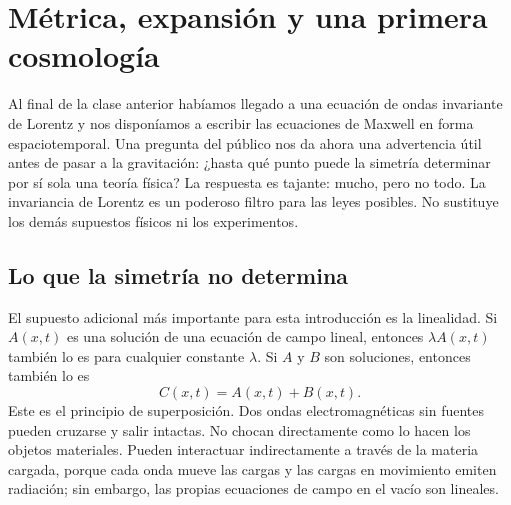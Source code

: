 \chapter{Métrica, expansión y una primera cosmología}

Al final de la clase anterior habíamos llegado a una ecuación de ondas invariante de Lorentz y nos disponíamos a escribir las ecuaciones de Maxwell en forma espaciotemporal. Una pregunta del público nos da ahora una advertencia útil antes de pasar a la gravitación: ¿hasta qué punto puede la simetría determinar por sí sola una teoría física? La respuesta es tajante: mucho, pero no todo. La invariancia de Lorentz es un poderoso filtro para las leyes posibles. No sustituye los demás supuestos físicos ni los experimentos.

\section{Lo que la simetría no determina}

\begin{classroomqa}
\end{classroomqa}

El supuesto adicional más importante para esta introducción es la linealidad. Si \(A(x,t)\) es una solución de una ecuación de campo lineal, entonces \(\lambda A(x,t)\) también lo es para cualquier constante \(\lambda\). Si \(A\) y \(B\) son soluciones, entonces también lo es \begin{equation}
  C(x,t)=A(x,t)+B(x,t).
  \label{eq:superposition}
\end{equation}
Este es el principio de superposición. Dos ondas electromagnéticas sin fuentes pueden cruzarse y salir intactas. No chocan directamente como lo hacen los objetos materiales. Pueden interactuar indirectamente a través de la materia cargada, porque cada onda mueve las cargas y las cargas en movimiento emiten radiación; sin embargo, las propias ecuaciones de campo en el vacío son lineales.

